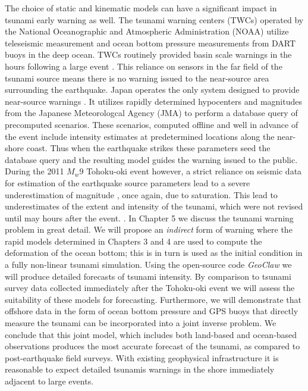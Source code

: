 The choice of static and kinematic models can have a significant impact in tsunami early warning as well. The tsunami warning centers (TWCs) operated by the National Oceanographic and Atmospheric Administration (NOAA) utilize teleseismic measurement and ocean bottom pressure measurements from DART buoys in the deep ocean. TWCs routinely provided basin scale warnings in the hours following a large event \citep{gonzalez2005,titov2005,mungov2013}. This reliance on sensors in the far field of the tsunami source means there is no warning issued to the near-source area surrounding the earthquake. Japan operates the only system designed to provide near-source warnings \citep{tatehata1997,ozaki2011}. It utilizes rapidly determined hypocenters and magnitudes from the Japanese Meteorologcal Agency (JMA) to perform a database query of precomputed scenarios. These scenarios, computed offline and well in advance of the event include intensity estimates at predetermined locations along the near-shore coast. Thus when the earthquake strikes these parameters seed the database query and the resulting model guides the warning issued to the public. During the 2011 $M_w$9 Tohoku-oki event however, a strict reliance on seismic data for estimation of the earthquake source parameters lead to a severe underestimation of magnitude \citep{hoshiba2011}, once again, due to saturation. This lead to underestimates of the extent and intensity of the tsunami, which were not revised until may hours after the event. \citep{ozaki2011}. In Chapter 5 we discuss the tsunami warning problem in great detail. We will propose an \textit{indirect} form of warning where the rapid models determined in Chapters 3 and 4 are used to compute the deformation of the ocean bottom; this is in turn is used as the initial condition in a  fully non-linear tsunami simulation. Using the open-source code \textit{GeoClaw} \citep{leveque2011} we will produce detailed forecasts of tsunami intensity. By comparison to tsunami survey data collected immediately after the Tohoku-oki event \citep{mori2011,mori2012} we will assess the suitability of these models for forecasting. Furthermore, we will demonstrate that offshore data in the form of ocean bottom pressure and GPS buoys that directly measure the tsunami can be incorporated into a joint inverse problem. We conclude that this joint model, which includes both land-based and ocean-based observations produces the most accurate forecast of the tsunami, as compared to post-earthquake field surveys. With existing geophysical infrastructure it is reasonable to expect detailed tsunamis warnings in the shore immediately adjacent to large events.



